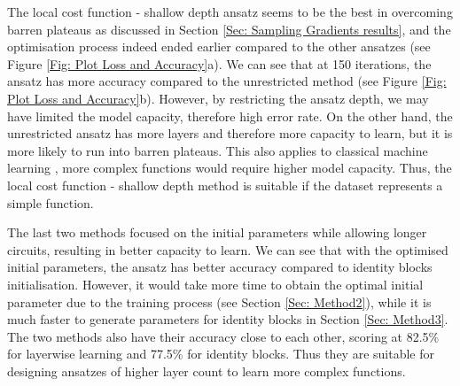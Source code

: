 The local cost function - shallow depth ansatz seems to be the best in overcoming barren plateaus as discussed in Section \ref{Sec: Sampling Gradients results}, and the optimisation process indeed ended earlier compared to the other ansatzes (see Figure \ref{Fig: Plot Loss and Accuracy}a).
We can see that at 150 iterations, the ansatz has more accuracy compared to the unrestricted method (see Figure \ref{Fig: Plot Loss and Accuracy}b).
However, by restricting the ansatz depth, we may have limited the model capacity, therefore high error rate.
On the other hand, the unrestricted ansatz has more layers and therefore more capacity to learn, but it is more likely to run into barren plateaus.
This also applies to classical machine learning \cite{ianDeepLearningAdaptive2016}, more complex functions would require higher model capacity.
Thus, the local cost function - shallow depth method is suitable if the dataset represents a simple function.

The last two methods focused on the initial parameters while allowing longer circuits, resulting in better capacity to learn.
We can see that with the optimised initial parameters, the ansatz has better accuracy compared to identity blocks initialisation.
However, it would take more time to obtain the optimal initial parameter due to the training process (see Section \ref{Sec: Method2}), while it is much faster to generate parameters for identity blocks in Section \ref{Sec: Method3}.
The two methods also have their accuracy close to each other, scoring at 82.5\% for layerwise learning and 77.5\% for identity blocks.
Thus they are suitable for designing ansatzes of higher layer count to learn more complex functions.


% 

